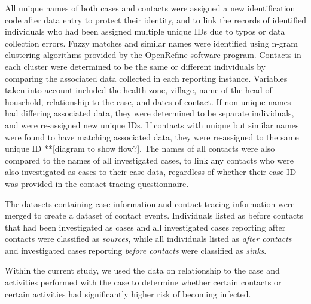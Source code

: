 All unique names of both cases and contacts were assigned a new identification code after data entry to protect their identity, and to link the records of identified individuals who had been assigned multiple unique IDs due to typos or data collection errors. Fuzzy matches and similar names were identified using n-gram clustering algorithms provided by the OpenRefine software program. Contacts in each cluster were determined to be the same or different individuals by comparing the associated data collected in each reporting instance. Variables taken into account included the health zone, village, name of the head of household, relationship to the case, and dates of contact. If non-unique names had differing associated data, they were determined to be separate individuals, and were re-assigned new unique IDs. If contacts with unique but similar names were found to have matching associated data, they were re-assigned to the same unique ID **[diagram to show flow?]. The names of all contacts were also compared to the names of all investigated cases, to link any contacts who were also investigated as cases to their case data, regardless of whether their case ID was provided in the contact tracing questionnaire. 

The datasets containing case information and contact tracing information were merged to create a dataset of contact events. Individuals listed as before contacts that had been investigated as cases and all investigated cases reporting after contacts were classified as \textit{sources}, while all individuals listed as \textit{after contacts} and investigated cases reporting \textit{before contacts} were classified as \textit{sinks}.

Within the current study, we used the data on relationship to the case and activities performed with the case to determine whether certain contacts or certain activities had significantly higher risk of becoming infected. 